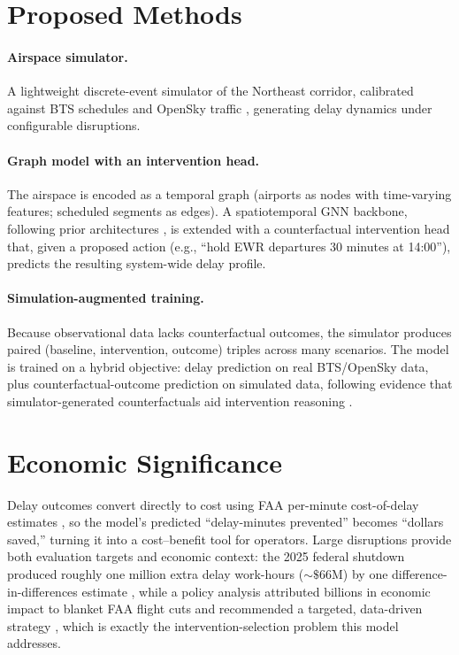 \documentclass[11pt]{article}
\begin{document}
\section{Proposed Methods}
\paragraph{Airspace simulator.} A lightweight discrete-event simulator of the
Northeast corridor, calibrated against BTS schedules and OpenSky traffic
\cite{opensky2014}, generating delay dynamics under configurable disruptions.

\paragraph{Graph model with an intervention head.} The airspace is encoded as a
temporal graph (airports as nodes with time-varying features; scheduled segments
as edges). A spatiotemporal GNN backbone, following prior architectures
\cite{cai2023, jiang2022}, is extended with a counterfactual intervention head
that, given a proposed action (e.g., ``hold EWR departures 30 minutes at 14:00''),
predicts the resulting system-wide delay profile.

\paragraph{Simulation-augmented training.} Because observational data lacks
counterfactual outcomes, the simulator produces paired
(baseline, intervention, outcome) triples across many scenarios. The model is
trained on a hybrid objective: delay prediction on real BTS/OpenSky data, plus
counterfactual-outcome prediction on simulated data, following evidence that
simulator-generated counterfactuals aid intervention reasoning \cite{shi2019}.

\section{Economic Significance}
Delay outcomes convert directly to cost using FAA per-minute cost-of-delay
estimates \cite{faacost2023}, so the model's predicted ``delay-minutes prevented''
becomes ``dollars saved,'' turning it into a cost--benefit tool for operators.
Large disruptions provide both evaluation targets and economic context: the 2025
federal shutdown produced roughly one million extra delay work-hours
($\sim\$66$M) by one difference-in-differences estimate \cite{richmondfed2025},
while a policy analysis attributed billions in economic impact to blanket FAA
flight cuts and recommended a targeted, data-driven strategy \cite{ctp2026}, which
is exactly the intervention-selection problem this model addresses.
\end{document}
